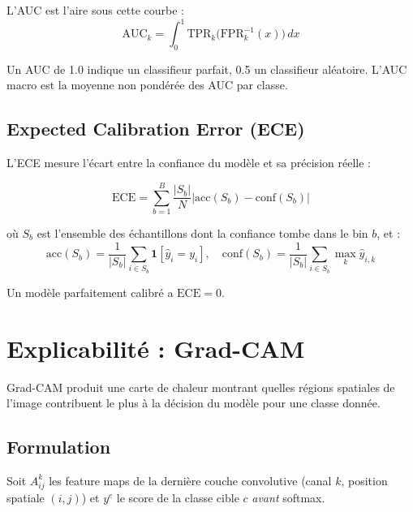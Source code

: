 \documentclass[11pt,a4paper]{article}
\begin{document}
L'AUC est l'aire sous cette courbe :
\begin{equation}
  \text{AUC}_k = \int_0^1 \text{TPR}_k\big(\text{FPR}_k^{-1}(x)\big)\,dx
\end{equation}

Un AUC de 1.0 indique un classifieur parfait, 0.5 un classifieur aléatoire. L'AUC macro est la moyenne non pondérée des AUC par classe.

\subsection{Expected Calibration Error (ECE)}

L'ECE mesure l'écart entre la confiance du modèle et sa précision réelle :

\begin{equation}
  \text{ECE} = \sum_{b=1}^{B} \frac{|S_b|}{N} \left|\text{acc}(S_b) - \text{conf}(S_b)\right|
\end{equation}

où $S_b$ est l'ensemble des échantillons dont la confiance tombe dans le bin $b$, et :
\begin{equation}
  \text{acc}(S_b) = \frac{1}{|S_b|}\sum_{i \in S_b} \mathbf{1}[\hat{y}_i = y_i], \quad
  \text{conf}(S_b) = \frac{1}{|S_b|}\sum_{i \in S_b} \max_k \hat{y}_{i,k}
\end{equation}

Un modèle parfaitement calibré a $\text{ECE} = 0$.

\section{Explicabilité : Grad-CAM}

\begin{defbox}
Grad-CAM produit une carte de chaleur montrant quelles régions spatiales de l'image contribuent le plus à la décision du modèle pour une classe donnée.
\end{defbox}

\subsection{Formulation}

Soit $A^k_{ij}$ les feature maps de la dernière couche convolutive (canal $k$, position spatiale $(i,j)$) et $y^c$ le score de la classe cible $c$ \emph{avant} softmax.
\end{document}
